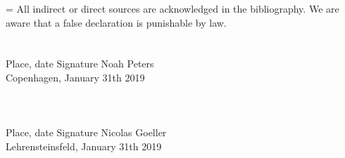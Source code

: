 \documentclass[preprint,12pt,authoryear]{elsarticle}
\begin{document}
	\hangindent=\parindent
	\parindent 0pt
	All indirect or direct sources are acknowledged in the bibliography. We are aware that a false declaration is punishable by law. 
	\\
	\\
	\\
	Place, date                                         	Signature Noah Peters
	\\
	Copenhagen, January 31th 2019\\
	\\
	\\
	\\
	Place, date												Signature Nicolas Goeller
	\\
	Lehrensteinsfeld, January 31th 2019
	
	
	
	
\end{document}
